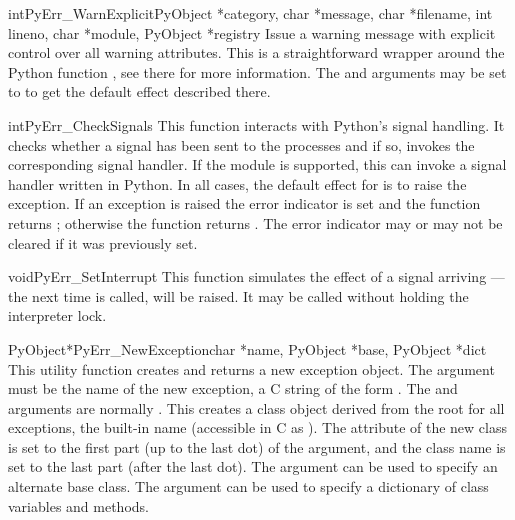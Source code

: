 \begin{cfuncdesc}{int}{PyErr_WarnExplicit}{PyObject *category, char *message,
                char *filename, int lineno, char *module, PyObject *registry}
  Issue a warning message with explicit control over all warning
  attributes.  This is a straightforward wrapper around the Python
  function , see there for more
  information.  The  and  arguments may be
  set to \NULL{} to get the default effect described there.
\end{cfuncdesc}

\begin{cfuncdesc}{int}{PyErr_CheckSignals}{}
  This function interacts with Python's signal handling.  It checks
  whether a signal has been sent to the processes and if so, invokes
  the corresponding signal handler.  If the
   module is supported, this can
  invoke a signal handler written in Python.  In all cases, the
  default effect for  is to raise the
   exception.  If an exception is raised
  the error indicator is set and the function returns ;
  otherwise the function returns .  The error indicator may or
  may not be cleared if it was previously set.
\end{cfuncdesc}

\begin{cfuncdesc}{void}{PyErr_SetInterrupt}{}
  This function simulates the effect of a
   signal arriving --- the next time
   is called,
   will be raised.  It may be called
  without holding the interpreter lock.
\end{cfuncdesc}

\begin{cfuncdesc}{PyObject*}{PyErr_NewException}{char *name,
                                                 PyObject *base,
                                                 PyObject *dict}
  This utility function creates and returns a new exception object.
  The  argument must be the name of the new exception, a C
  string of the form .  The  and
   arguments are normally \NULL.  This creates a class
  object derived from the root for all exceptions, the built-in name
   (accessible in C as ).
  The  attribute of the new class is set to the
  first part (up to the last dot) of the  argument, and the
  class name is set to the last part (after the last dot).  The
   argument can be used to specify an alternate base class.
  The  argument can be used to specify a dictionary of class
  variables and methods.
\end{cfuncdesc}

